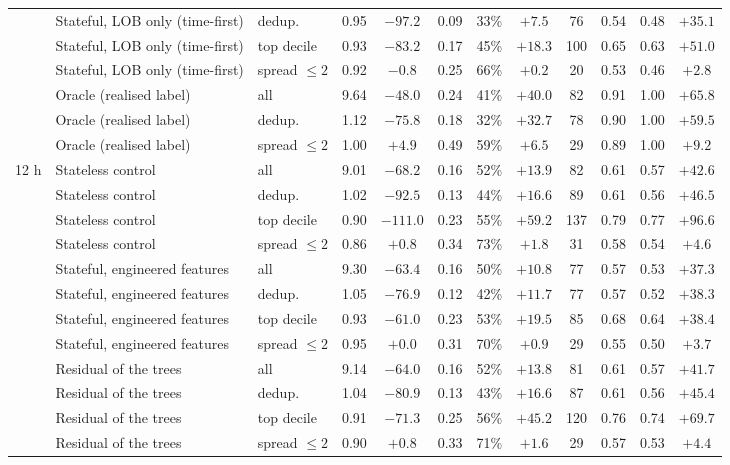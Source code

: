 \begin{table}[p]
\begin{fittable}
\begin{tabular}{lllrcccccccc}
 & Stateful, LOB only (time-first) & dedup. & 0.95 & $-97.2$ & 0.09 & 33\% & $+7.5$ & 76 & 0.54 & 0.48 & $+35.1$ \\
 & Stateful, LOB only (time-first) & top decile & 0.93 & $-83.2$ & 0.17 & 45\% & $+18.3$ & 100 & 0.65 & 0.63 & $+51.0$ \\
 & Stateful, LOB only (time-first) & spread $\le 2$ & 0.92 & $-0.8$ & 0.25 & 66\% & $+0.2$ & 20 & 0.53 & 0.46 & $+2.8$ \\
 & Oracle (realised label) & all & 9.64 & $-48.0$ & 0.24 & 41\% & $+40.0$ & 82 & 0.91 & 1.00 & $+65.8$ \\
 & Oracle (realised label) & dedup. & 1.12 & $-75.8$ & 0.18 & 32\% & $+32.7$ & 78 & 0.90 & 1.00 & $+59.5$ \\
 & Oracle (realised label) & spread $\le 2$ & 1.00 & $+4.9$ & 0.49 & 59\% & $+6.5$ & 29 & 0.89 & 1.00 & $+9.2$ \\
\midrule
12 h & Stateless control & all & 9.01 & $-68.2$ & 0.16 & 52\% & $+13.9$ & 82 & 0.61 & 0.57 & $+42.6$ \\
 & Stateless control & dedup. & 1.02 & $-92.5$ & 0.13 & 44\% & $+16.6$ & 89 & 0.61 & 0.56 & $+46.5$ \\
 & Stateless control & top decile & 0.90 & $-111.0$ & 0.23 & 55\% & $+59.2$ & 137 & 0.79 & 0.77 & $+96.6$ \\
 & Stateless control & spread $\le 2$ & 0.86 & $+0.8$ & 0.34 & 73\% & $+1.8$ & 31 & 0.58 & 0.54 & $+4.6$ \\
 & Stateful, engineered features & all & 9.30 & $-63.4$ & 0.16 & 50\% & $+10.8$ & 77 & 0.57 & 0.53 & $+37.3$ \\
 & Stateful, engineered features & dedup. & 1.05 & $-76.9$ & 0.12 & 42\% & $+11.7$ & 77 & 0.57 & 0.52 & $+38.3$ \\
 & Stateful, engineered features & top decile & 0.93 & $-61.0$ & 0.23 & 53\% & $+19.5$ & 85 & 0.68 & 0.64 & $+38.4$ \\
 & Stateful, engineered features & spread $\le 2$ & 0.95 & $+0.0$ & 0.31 & 70\% & $+0.9$ & 29 & 0.55 & 0.50 & $+3.7$ \\
 & Residual of the trees & all & 9.14 & $-64.0$ & 0.16 & 52\% & $+13.8$ & 81 & 0.61 & 0.57 & $+41.7$ \\
 & Residual of the trees & dedup. & 1.04 & $-80.9$ & 0.13 & 43\% & $+16.6$ & 87 & 0.61 & 0.56 & $+45.4$ \\
 & Residual of the trees & top decile & 0.91 & $-71.3$ & 0.25 & 56\% & $+45.2$ & 120 & 0.76 & 0.74 & $+69.7$ \\
 & Residual of the trees & spread $\le 2$ & 0.90 & $+0.8$ & 0.33 & 71\% & $+1.6$ & 29 & 0.57 & 0.53 & $+4.4$ \\

\end{tabular}
\end{fittable}
\end{table}
